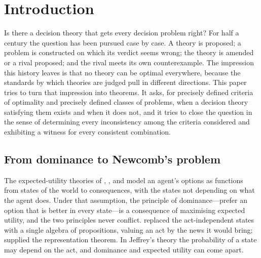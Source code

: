 \section{Introduction}\label{sec:intro}

Is there a decision theory that gets every decision problem right? For half a century the question
has been pursued case by case. A theory is proposed; a problem is constructed on which its verdict
seems wrong; the theory is amended or a rival proposed; and the rival meets its own
counterexample. The impression this history leaves is that no theory can be optimal everywhere,
because the standards by which theories are judged pull in different directions. This paper tries to
turn that impression into theorems. It asks, for precisely defined criteria of optimality and
precisely defined classes of problems, when a decision theory satisfying them exists and when it
does not, and it tries to close the question in the sense of determining every inconsistency among
the criteria considered and exhibiting a witness for every consistent combination.

\subsection{From dominance to Newcomb's problem}

The expected-utility theories of \textcite{ramsey1931}, \textcite{vonneumannmorgenstern1944}, and
\textcite{savage1954} model an agent's options as functions from states of the world to
consequences, with the states not depending on what the agent does. Under that assumption, the
principle of dominance---prefer an option that is better in every state---is a consequence of
maximising expected utility, and the two principles never conflict. \textcite{jeffrey1965} replaced
the act-independent states with a single algebra of propositions, valuing an act by the news it
would bring; \textcite{bolker1966,bolker1967} supplied the representation theorem. In Jeffrey's theory
the probability of a state may depend on the act, and dominance and expected utility can come apart.

